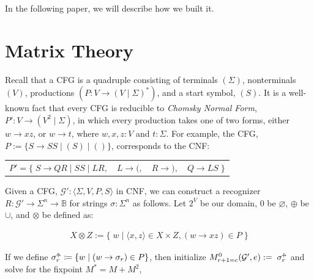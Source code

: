 \documentclass[sigplan,nonacm]{acmart}\settopmatter{printfolios=false,printccs=false,printacmref=false}
\begin{document}
\noindent In the following paper, we will describe how we built it.

\section{Matrix Theory}

Recall that a CFG is a quadruple consisting of terminals $(\Sigma)$, nonterminals $(V)$, productions $(P\colon V \rightarrow (V \mid \Sigma)^*)$, and a start symbol, $(S)$. It is a well-known fact that every CFG is reducible to \textit{Chomsky Normal Form}, $P'\colon V \rightarrow (V^2 \mid \Sigma)$, in which every production takes one of two forms, either $w \rightarrow xz$, or $w \rightarrow t$, where $w, x, z: V$ and $t: \Sigma$. For example, the CFG, $P:=\{S \rightarrow S S \mid ( S ) \mid ()\}$, corresponds to the CNF:\vspace{-3pt}

\begin{table}[H]
    \begin{tabular}{llll}
        $P'=\big\{\;S\rightarrow QR \mid SS \mid LR,$ & $L \rightarrow (,$ & $R \rightarrow ),$ & $Q\rightarrow LS\;\big\}$
    \end{tabular}
\end{table}\vspace{-8pt}

\noindent Given a CFG, $\mathcal{G}' : \langle \Sigma, V, P, S\rangle$ in CNF, we can construct a recognizer $R: \mathcal{G}' \rightarrow \Sigma^n \rightarrow \mathbb{B}$ for strings $\sigma: \Sigma^n$ as follows. Let $2^V$ be our domain, $0$ be $\varnothing$, $\oplus$ be $\cup$, and $\otimes$ be defined as:\vspace{-10pt}

\begin{align}
    X \otimes Z := \big\{\;w \mid \langle x, z\rangle \in X \times Z, (w\rightarrow xz) \in P\;\big\}
\end{align}

\noindent If we define $\sigma_r^{\shortuparrow\hspace{-5pt}\shortrightarrow} \coloneqq \{w \mid (w \rightarrow \sigma_r) \in P\}$, then initialize $M^0_{r+1=c}(\mathcal{G}', e) := \;\sigma_r^{\shortuparrow\hspace{-5pt}\shortrightarrow}$ and solve for the fixpoint $M^* = M + M^2$,\vspace{-10pt}
\end{document}
